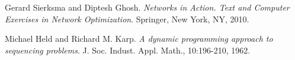 \begin{thebibliography}{9}

Gerard Sierksma and Diptesh Ghosh.
\emph{Networks in Action. Text and Computer Exercises in Network Optimization}.
Springer, New York, NY, 2010.

Michael Held and Richard M. Karp.
\emph{A dynamic programming approach to sequencing problems}.
J. Soc. Indust. Appl. Math., 10:196-210, 1962.

\end{thebibliography}
